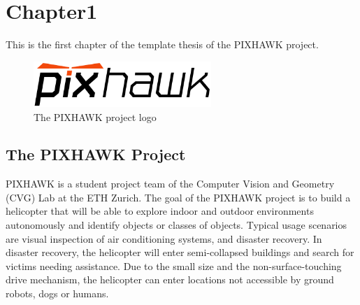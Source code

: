 \graphicspath{{chapter1/}}

\chapter{Chapter1}
\label{cha:chapter1}

This is the first chapter of the template thesis of the PIXHAWK project.\\

\begin{figure}[htbp]
	\centering
		\includegraphics[width=0.60\textwidth]{pixhawk-logo.png}
	\caption{The PIXHAWK project logo \cite{pix_wiki}}
	\label{fig:pixhawk-logo}
\end{figure}

\section{The PIXHAWK Project}
\label{sec:pixhawkproject}

PIXHAWK is a student project team of the Computer Vision and Geometry (CVG) Lab at the ETH Zurich. The goal of the PIXHAWK project is to build a helicopter that will be able to explore indoor and outdoor environments autonomously and identify objects or classes of objects. Typical usage scenarios are visual inspection of air conditioning systems, and disaster recovery. In disaster recovery, the helicopter will enter semi-collapsed buildings and search for victims needing assistance. Due to the small size and the non-surface-touching drive mechanism, the helicopter can enter locations not accessible by ground robots, dogs or humans.

\cleardoublepage
